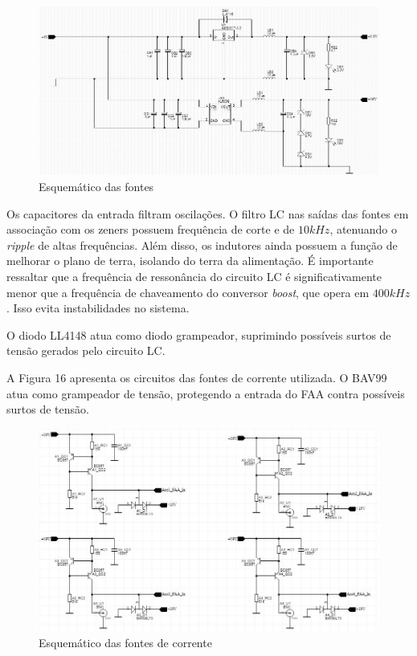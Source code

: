 \documentclass[11pt]{abntex2}
\begin{document}
					\begin{figure}[!ht]
						\centering
						\includegraphics[width=\linewidth]{../Fotos/fonte.jpg}
						\caption{Esquemático das fontes}
					\end{figure}

					Os capacitores da entrada filtram oscilações. O filtro LC
					nas saídas das fontes em associação com os zeners possuem
					frequência de corte e de $10kHz$, atenuando o
					\textit{ripple} de altas frequências. Além disso, os
					indutores ainda possuem a função de melhorar o plano de
					terra, isolando do terra da alimentação. É importante
					ressaltar que a frequência de ressonância do circuito LC é
					significativamente menor que a frequência de chaveamento do
					conversor \textit{boost}, que opera em $400kHz$. Isso evita
					instabilidades no sistema.

					O diodo LL4148 atua como diodo grampeador, suprimindo
					possíveis surtos de tensão gerados pelo circuito LC.

					A Figura 16 apresenta os circuitos das fontes de corrente
					utilizada. O BAV99 atua como grampeador de tensão,
					protegendo a entrada do FAA contra possíveis surtos de
					tensão.

					\begin{figure}[!ht]
						\centering
						\includegraphics[width=\linewidth]{../Fotos/fonteCorrenteEsquematico.jpg}
						\caption{Esquemático das fontes de corrente}
					\end{figure}				
\end{document}
